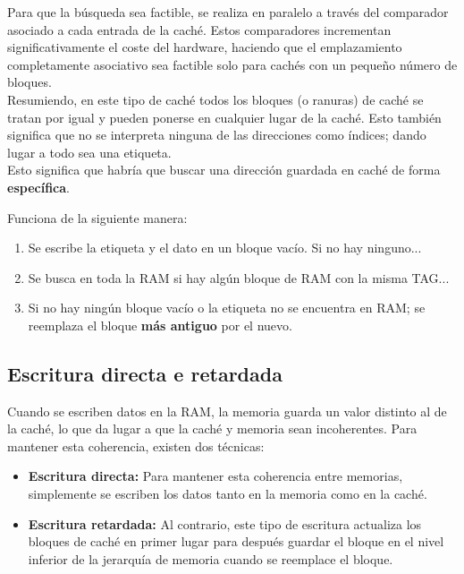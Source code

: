 \documentclass[12pt]{article}
\begin{document}
		Para que la búsqueda sea factible, se realiza en paralelo a través del comparador asociado a cada entrada de la caché. Estos comparadores incrementan significativamente el coste del hardware, haciendo que el emplazamiento completamente asociativo sea factible solo para cachés con un pequeño número de bloques. \cite{patterson-2011}\\

		Resumiendo, en este tipo de caché todos los bloques (o ranuras) de caché se tratan por igual y pueden ponerse en cualquier lugar de la caché. Esto también significa que no se interpreta ninguna de las direcciones como índices; dando lugar a todo sea una etiqueta. \cite{fully_asociative_cache}\\

		\newpage
		Esto significa que habría que buscar una dirección guardada en caché de forma \textbf{específica}.

		Funciona de la siguiente manera:
		\begin{enumerate}
			\item Se escribe la etiqueta y el dato en un bloque vacío. Si no hay ninguno...
			\item Se busca en toda la RAM si hay algún bloque de RAM con la misma TAG...
			\item Si no hay ningún bloque vacío o la etiqueta no se encuentra en RAM; se reemplaza el bloque \textbf{más antiguo} por el nuevo.
		\end{enumerate}

	\subsection{Escritura directa e retardada}

		Cuando se escriben datos en la RAM, la memoria guarda un valor distinto al de la caché, lo que da lugar a que la caché y memoria sean incoherentes. Para mantener esta coherencia, existen dos técnicas:

		\begin{itemize}
			\item \textbf{Escritura directa:} Para mantener esta coherencia entre memorias, simplemente se escriben los datos tanto en la memoria como en la caché. \cite{patterson-2011}
			\item \textbf{Escritura retardada:} Al contrario, este tipo de escritura actualiza los bloques de caché en primer lugar para después guardar el bloque en el nivel inferior de la jerarquía de memoria cuando se reemplace el bloque. \cite{patterson-2011}
		\end{itemize}


\newpage

\printbibliography[title={Bibliografía y agradecimientos}]
\end{document}
